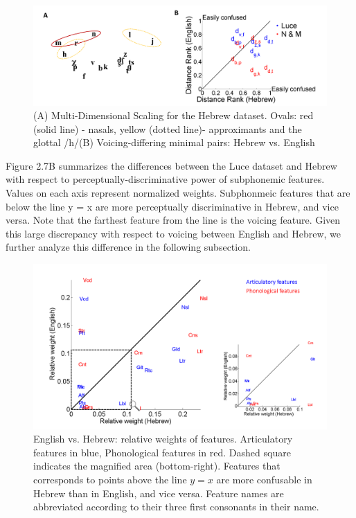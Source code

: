 \begin{figure}
\vspace{.3in}
\includegraphics[width=\linewidth]{Figures/Ch2/Slide5.PNG}
\caption{(A) Multi-Dimensional Scaling for the Hebrew dataset. Ovals: red (solid line) - nasals, yellow (dotted line)- approximants and the glottal /h/(B) Voicing-differing minimal pairs: Hebrew vs. English}
\end{figure}

Figure 2.7B summarizes the differences between the Luce dataset and Hebrew with respect to perceptually-discriminative power of subphonemic features. Values on each axis represent normalized weights. Subphonmeic features that are below the line y = x are more perceptually discriminative in Hebrew, and vice versa. Note that the farthest feature from the line is the voicing feature. Given this large discrepancy with respect to voicing between English and Hebrew, we further analyze this difference in the following subsection.

\begin{figure}
\vspace{.3in}
\includegraphics[width=\linewidth]{Figures/Ch2/compare_Heb_Luce.PNG}
\caption{English vs. Hebrew: relative weights of features. Articulatory features in blue, Phonological features in red. Dashed square indicates the magnified area (bottom-right). Features that corresponds to points above the line $y=x$ are more confusable in Hebrew than in English, and vice versa. Feature names are abbreviated according to their three first consonants in their name.}
\end{figure}


